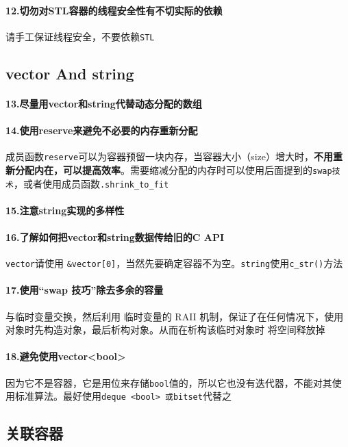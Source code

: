 \documentclass[UTF8,a4paper,12pt]{ctexbook}
\begin{document}
			\paragraph{12.切勿对STL容器的线程安全性有不切实际的依赖} 请手工保证线程安全，不要依赖\verb|STL|
		\subsection{vector And string}
			\paragraph{13.尽量用vector和string代替动态分配的数组}
			\paragraph{14.使用reserve来避免不必要的内存重新分配} 成员函数\verb|reserve|可以为容器预留一块内存，当容器大小（size）增大时，\textbf{不用重新分配内在，可以提高效率}。需要缩减分配的内存时可以使用后面提到的\verb|swap技术|，或者使用成员函数\verb|.shrink_to_fit|
			
			\paragraph{15.注意string实现的多样性}
			\paragraph{16.了解如何把vector和string数据传给旧的C API} \verb|vector|请使用 \verb|&vector[0]|，当然先要确定容器不为空。\verb|string|使用\verb|c_str()|方法
			
			\paragraph{17.使用“swap 技巧”除去多余的容量} 与临时变量交换，然后利用 临时变量的 RAII 机制，保证了在任何情况下，使用对象时先构造对象，最后析构对象。从而在析构该临时对象时 将空间释放掉
			
			\paragraph{18.避免使用vector<bool>} 因为它不是容器，它是用位来存储\verb|bool|值的，所以它也没有迭代器，不能对其使用标准算法。最好使用\verb|deque <bool> 或bitset|代替之
			
		\subsection{关联容器}
\end{document}
